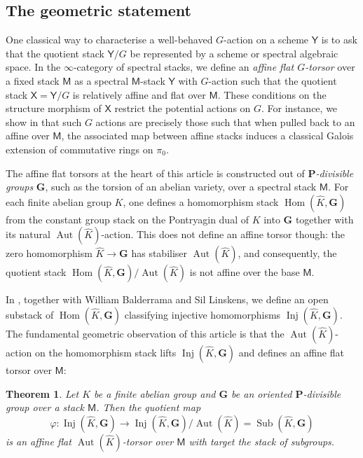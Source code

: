 \documentclass[11pt, a4paper]{article}
\newcommand{\1}{\mathbf{1}}
\DeclareMathOperator{\Inj}{Inj}
\DeclareMathOperator{\Sub}{Sub}
\DeclareMathOperator{\Aut}{Aut}
\DeclareMathOperator{\Hom}{Hom}
\newcommand{\dual}[1]{{\widehat{#1}}}
\newcommand{\G}{\mathbf{G}}
\newcommand{\M}{\mathsf{M}}
\renewcommand{\P}{\mathbf{P}}
\newcommand{\X}{\mathsf{X}}
\newcommand{\Y}{\mathsf{Y}}
\theoremstyle{plain}
\newtheorem{theoremalph}{Theorem}
\theoremstyle{definition}
\theoremstyle{remark}\numberwithin{equation}{section}
\begin{document}
\subsection*{The geometric statement}
One classical way to characterise a well-behaved $G$-action on a scheme $\Y$ is to ask that the quotient stack $\Y/G$ be represented by a scheme or spectral algebraic space. In the $\infty$-category of spectral stacks, we define an \emph{affine flat $G$-torsor} over a fixed stack $\M$ as a spectral $\M$-stack $\Y$ with $G$-action such that the quotient stack $\X = \Y / G$ is relatively affine and flat over $\M$. These conditions on the structure morphism of $\X$ restrict the potential actions on $G$. For instance, we show in  that such $G$ actions are precisely those such that when pulled back to an affine over $\M$, the associated map between affine stacks induces a classical Galois extension of commutative rings on $\pi_0$.

The affine flat torsors at the heart of this article is constructed out of \emph{$\P$-divisible groups} $\G$, such as the torsion of an abelian variety, over a spectral stack $\M$. For each finite abelian group $K$, one defines a homomorphism stack $\Hom(\dual{K}, \G)$ from the constant group stack on the Pontryagin dual of $K$ into $\G$ together with its natural $\Aut(\dual{K})$-action. This does not define an affine torsor though: the zero homomorphism $\dual{K} \to \G$ has stabiliser $\Aut(\dual{K})$, and consequently, the quotient stack $\Hom(\dual{K}, \G)/\Aut(\dual{K})$ is not affine over the base $\M$.

In \cite{temperedglobal}, together with William Balderrama and Sil Linskens, we define an open substack of $\Hom(\dual{K}, \G)$ classifying injective homomorphisms $\Inj(\dual{K}, \G)$. The fundamental geometric observation of this article is that the $\Aut(\dual{K})$-action on the homomorphism stack lifts $\Inj(\dual{K}, \G)$ and defines an affine flat torsor over $\M$:

\begin{theoremalph}\label{main_geometric}
    Let $K$ be a finite abelian group and $\G$ be an oriented $\P$-divisible group over a stack $\M$. Then the quotient map
    \[\varphi\colon \Inj(\dual{K}, \G) \to \Inj(\dual{K}, \G) / \Aut(\dual{K}) = \Sub(\dual{K}, \G)\]
    is an affine flat $\Aut(\dual{K})$-torsor over $\M$ with target the \emph{stack of subgroups}.
\end{theoremalph}
\end{document}
